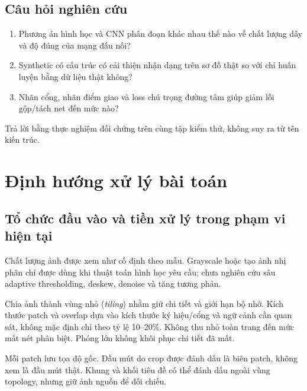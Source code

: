 \documentclass[11pt,a4paper]{article}
\begin{document}
\subsection{Câu hỏi nghiên cứu}
\begin{enumerate}[label=\textbf{Q\arabic*.}]
  \item Phương án hình học và CNN phân đoạn khác nhau thế nào về chất lượng dây và độ đúng của mạng đấu nối?
  \item Synthetic có cấu trúc có cải thiện nhận dạng trên sơ đồ thật so với chỉ huấn luyện bằng dữ liệu thật không?
  \item Nhãn cổng, nhãn điểm giao và loss chú trọng đường tâm giúp giảm lỗi gộp/tách net đến mức nào?
\end{enumerate}
Trả lời bằng thực nghiệm đối chứng trên cùng tập kiểm thử, không suy ra từ tên kiến trúc.

\section{Định hướng xử lý bài toán}
\subsection{Tổ chức đầu vào và tiền xử lý trong phạm vi hiện tại}
Chất lượng ảnh được xem như cố định theo mẫu. Grayscale hoặc tạo ảnh nhị phân chỉ được dùng khi thuật toán hình học yêu cầu; chưa nghiên cứu sâu adaptive thresholding, deskew, denoise và tăng tương phản.

Chia ảnh thành vùng nhỏ (\emph{tiling}) nhằm giữ chi tiết và giới hạn bộ nhớ. Kích thước patch và overlap dựa vào kích thước ký hiệu/cổng và ngữ cảnh cần quan sát, không mặc định chỉ theo tỷ lệ 10--20\%. Không thu nhỏ toàn trang đến mức mất nét phân biệt. Phóng lớn không khôi phục chi tiết đã mất.

Mỗi patch lưu tọa độ gốc. Đầu mút do crop được đánh dấu là biên patch, không xem là đầu mút thật. Khung và khối tiêu đề có thể đánh dấu ngoài vùng topology, nhưng giữ ảnh nguồn để đối chiếu.
\end{document}
